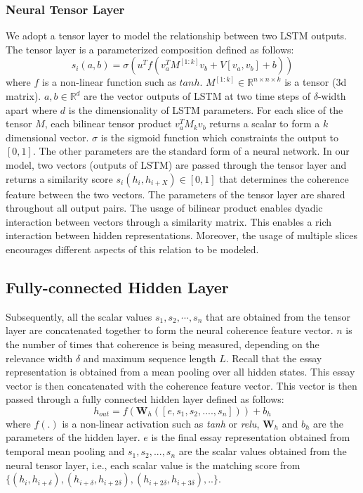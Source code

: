 \documentclass[letterpaper]{article}
\begin{document}
\subsubsection{Neural Tensor Layer}
We adopt a tensor layer to model the relationship between two LSTM outputs. The tensor layer is a parameterized composition defined as follows:
\begin{equation}
s_i(a,b) = \sigma(u^T f(v^{T}_{a} M^{[1:k]}v_b + V[v_a, v_b] +b))
\end{equation} 
where $f$ is a non-linear function such as $tanh$. $M^{[1:k]} \in \mathbb{R}^{n \times n \times k}$ is a tensor (3d matrix). $a,b \in \mathbb{R}^{d}$ are the vector outputs of LSTM at two time steps of $\delta$-width apart where $d$ is the dimensionality of LSTM parameters. For each slice of the tensor $M$, each bilinear tensor product $v^{T}_{a} M_k v_b$ returns a scalar to form a $k$ dimensional vector. $\sigma$ is the sigmoid function which constraints the output to $[0,1]$. The other parameters are the standard form of a neural network. In our model, two vectors (outputs of LSTM) are passed through the tensor layer and returns a similarity score $s_i(h_i,h_{i+X})\in[0,1]$ that determines the coherence feature between the two vectors. The parameters of the tensor layer are shared throughout all output pairs. The usage of bilinear product enables dyadic interaction between vectors through a similarity matrix. This enables a rich interaction between hidden representations. Moreover, the usage of multiple slices encourages different aspects of this relation to be modeled. 

\subsection{Fully-connected Hidden Layer}
Subsequently, all the scalar values $s_1,s_2,\cdots,s_n$ that are obtained from the tensor layer are concatenated together to form the neural coherence feature vector. $n$ is the number of times that coherence is being measured, depending on the relevance width $\delta$ and maximum sequence length $L$. Recall that the essay representation is obtained from a mean pooling over all hidden states. This essay vector is then concatenated with the coherence feature vector. This vector is then passed through a fully connected hidden layer defined as follows: 
\begin{equation}
h_{out} = f (\textbf{W}_h([e, s_1,s_2,....,s_n])) + b_h
\end{equation}
where $f(.)$ is a non-linear activation such as \textit{tanh} or \textit{relu}, $\textbf{W}_h$ and $b_h$ are the parameters of the hidden layer. $e$ is the final essay representation obtained from temporal mean pooling and $s_1,s_2,...,s_n$ are the scalar values obtained from the neural tensor layer, i.e., each scalar value is the matching score from  $\{ (h_i,h_{i+\delta}),(h_{i+\delta},h_{i+2\delta}),(h_{i+2\delta},h_{i+3\delta}),..\}$. 
\end{document}
